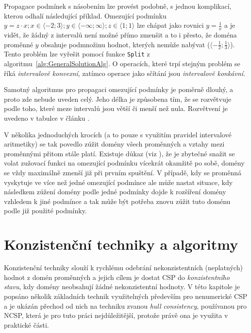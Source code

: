 Propagace podmínek s násobením lze provést podobně, s jednou komplikací, kterou odhalí následující příklad. Omezující podmínku $y = z \cdot x; x \in \langle -2;3 \rangle; y \in \langle -\infty ; \infty \rangle; z \in \langle 1;1 \rangle $ lze chápat jako rovnici $ y = \frac{1}{x}$ a je vidět, že žádný z intervalů není možné přímo zmenšit a to i přesto, že doména proměnné $y$ obsahuje podmnožinu hodnot, kterých nemůže nabývat ($ \langle -\frac{1}{2};\frac{1}{3} \rangle $). Tento problém lze vyřešit pomocí funkce \verb|Split| z algoritmu~\ref{alg:GeneralSolutionAlg}. O operacích, které trpí stejným problém se říká \emph{intervalově konvexní}, zatímco operace jako sčítání jsou \emph{intervalově konkávní}.

Samotný algoritmus pro propagaci omezující podmínky je poměrně dlouhý, a proto zde nebude uveden celý. Jeho délka je způsobena tím, že se rozvětvuje podle toho, které meze intervalů jsou větší či menší než nula. Rozvětvení je uvedeno v tabulce v článku \cite{hickeyImplementation}.

V několika jednoduchých krocích (a to pouze s využitím pravidel intervalové aritmetiky) se tak povedlo zúžit domény všech proměnných a vztahy mezi proměnnými přitom stále platí. Existuje důkaz (viz \cite{cleary87}), že je zbytečné snažit se volat zužovací funkci na omezující podmínku vícekrát okamžitě po sobě, domény se vždy maximálně zmenší již při prvním spuštění. V případě, kdy se proměnná vyskytuje ve více než jedné omezující podmínce ale může nastat situace, kdy následkem zúžení domény podle jedné podmínky dojde k rozšíření domény vzhledem k jiné podmínce a tak může být potřeba znovu zúžit tuto doménu podle již použité podmínky.





\section{Konzistenční techniky a algoritmy}
Konzistenční techniky slouží k rychlému odebrání nekonzistentních (neplatných) hodnot z domén proměnných a jejich cílem je dostat CSP do \emph{konzistentního stavu}, kdy domény neobsahují žádné nekonzistentní hodnoty. V této kapitole je popsáno několik základních technik využitelných především pro nenumerické CSP a je ukázán přechod od nich na techniku zvanou \emph{hull consistency}, používanou pro NCSP, která je pro tuto práci nejdůležitější, protože právě ona je využita v praktické části.

